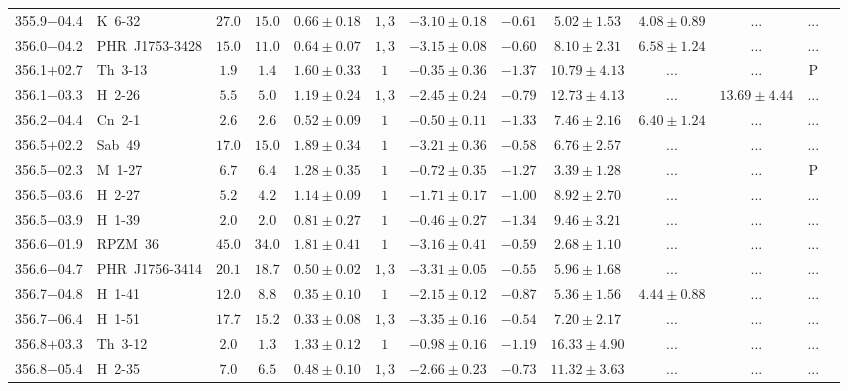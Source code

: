 \documentclass[useAMS]{mn2e}
\begin{document}
\begin{center}
{\begin{longtable}{llccccccccccc}
355.9$-$04.4&K~6-32&$      27.0$&$      15.0$&$0.66 \pm 0.18$&$1,3$&$-3.10 \pm 0.18$&$     -0.61$&$5.02 \pm 1.53$&$4.08 \pm 0.89$&$...$&...\\
356.0$-$04.2&PHR~J1753-3428&$      15.0$&$      11.0$&$0.64 \pm 0.07$&$1,3$&$-3.15 \pm 0.08$&$     -0.60$&$8.10 \pm 2.31$&$6.58 \pm 1.24$&$...$&...\\
356.1$+$02.7&Th~3-13&$       1.9$&$       1.4$&$1.60 \pm 0.33$&$1$&$-0.35 \pm 0.36$&$     -1.37$&$10.79 \pm 4.13$&$...$&$...$&P\\
356.1$-$03.3&H~2-26&$       5.5$&$       5.0$&$1.19 \pm 0.24$&$1,3$&$-2.45 \pm 0.24$&$     -0.79$&$12.73 \pm 4.13$&$...$&$13.69 \pm 4.44$&...\\
356.2$-$04.4&Cn~2-1&$       2.6$&$       2.6$&$0.52 \pm 0.09$&$1$&$-0.50 \pm 0.11$&$     -1.33$&$7.46 \pm 2.16$&$6.40 \pm 1.24$&$...$&...\\
356.5$+$02.2&Sab~49&$      17.0$&$      15.0$&$1.89 \pm 0.34$&$1$&$-3.21 \pm 0.36$&$     -0.58$&$6.76 \pm 2.57$&$...$&$...$&...\\
356.5$-$02.3&M~1-27&$       6.7$&$       6.4$&$1.28 \pm 0.35$&$1$&$-0.72 \pm 0.35$&$     -1.27$&$3.39 \pm 1.28$&$...$&$...$&P\\
356.5$-$03.6&H~2-27&$       5.2$&$       4.2$&$1.14 \pm 0.09$&$1$&$-1.71 \pm 0.17$&$     -1.00$&$8.92 \pm 2.70$&$...$&$...$&...\\
356.5$-$03.9&H~1-39&$       2.0$&$       2.0$&$0.81 \pm 0.27$&$1$&$-0.46 \pm 0.27$&$     -1.34$&$9.46 \pm 3.21$&$...$&$...$&...\\
356.6$-$01.9&RPZM~36&$      45.0$&$      34.0$&$1.81 \pm 0.41$&$1$&$-3.16 \pm 0.41$&$     -0.59$&$2.68 \pm 1.10$&$...$&$...$&...\\
356.6$-$04.7&PHR~J1756-3414&$      20.1$&$      18.7$&$0.50 \pm 0.02$&$1,3$&$-3.31 \pm 0.05$&$     -0.55$&$5.96 \pm 1.68$&$...$&$...$&...\\
356.7$-$04.8&H~1-41&$      12.0$&$       8.8$&$0.35 \pm 0.10$&$1$&$-2.15 \pm 0.12$&$     -0.87$&$5.36 \pm 1.56$&$4.44 \pm 0.88$&$...$&...\\
356.7$-$06.4&H~1-51&$      17.7$&$      15.2$&$0.33 \pm 0.08$&$1,3$&$-3.35 \pm 0.16$&$     -0.54$&$7.20 \pm 2.17$&$...$&$...$&...\\
356.8$+$03.3&Th~3-12&$       2.0$&$       1.3$&$1.33 \pm 0.12$&$1$&$-0.98 \pm 0.16$&$     -1.19$&$16.33 \pm 4.90$&$...$&$...$&...\\
356.8$-$05.4&H~2-35&$       7.0$&$       6.5$&$0.48 \pm 0.10$&$1,3$&$-2.66 \pm 0.23$&$     -0.73$&$11.32 \pm 3.63$&$...$&$...$&...\\

\end{longtable}}
\end{center}
\end{document}
